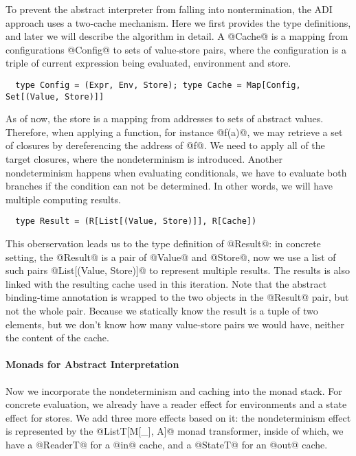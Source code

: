 To prevent the abstract interpreter from falling into nontermination, the ADI
approach uses a two-cache mechanism. Here we first provides the type
definitions, and later we will describe the algorithm in detail. A @Cache@ is a
mapping from configurations @Config@ to sets of value-store pairs, where the
configuration is a triple of current expression being evaluated, environment and
store.

\begin{lstlisting}
  type Config = (Expr, Env, Store); type Cache = Map[Config, Set[(Value, Store)]]
\end{lstlisting}

As of now, the store is a mapping from addresses to sets of abstract values.
Therefore, when applying a function, for instance @f(a)@, we may retrieve a set
of closures by dereferencing the address of @f@. We need to apply all of the
target closures, where the nondeterminism is introduced. Another nondeterminism
happens when evaluating conditionals, we have to evaluate both branches if the
condition can not be determined. In other words, we will have multiple computing
results.

\begin{lstlisting}
  type Result = (R[List[(Value, Store)]], R[Cache])
\end{lstlisting}

This oberservation leads us to the type definition of @Result@: in concrete setting,
the @Result@ is a pair of @Value@ and @Store@, now we use a list of such pairs
@List[(Value, Store)]@ to represent multiple results. The results is also linked
with the resulting cache used in this iteration.
Note that the abstract binding-time annotation is wrapped to the two objects in
the @Result@ pair, but not the whole pair. Because we statically know the result
is a tuple of two elements, but we don't know how many value-store pairs we
would have, neither the content of the cache.

\paragraph{Monads for Abstract Interpretation} Now we incorporate the
nondeterminism and caching into the monad stack. For concrete evaluation, we
already have a reader effect for environments and a state effect for stores. We
add three more effects based on it: the nondeterminism effect is represented by
the @ListT[M[_], A]@ monad transformer, inside of which, we have a @ReaderT@ for
a @in@ cache, and a @StateT@ for an @out@ cache.

